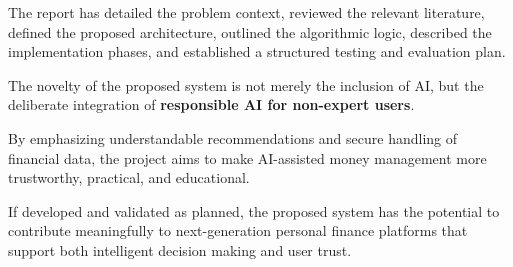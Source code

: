 \documentclass[12pt,a4paper]{report}
\begin{document}
The report has detailed the problem context,
reviewed the relevant literature,
defined the proposed architecture,
outlined the algorithmic logic,
described the implementation phases,
and established a structured testing and evaluation plan.

The novelty of the proposed system is not merely the inclusion of AI,
but the deliberate integration of
\textbf{responsible AI for non-expert users}.

By emphasizing understandable recommendations and secure handling of financial data,
the project aims to make AI-assisted money management more trustworthy,
practical,
and educational.

If developed and validated as planned,
the proposed system has the potential to contribute meaningfully to next-generation personal finance platforms that support both intelligent decision making and user trust.
\end{document}

